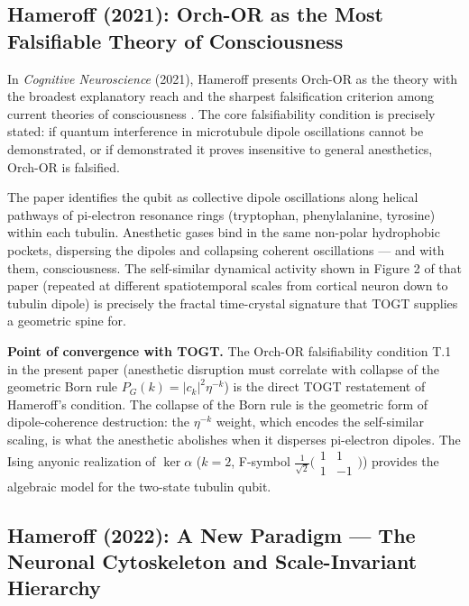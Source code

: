 \documentclass[11pt,a4paper]{article}
\theoremstyle{definition}
\theoremstyle{remark}
\begin{document}
\subsection{Hameroff (2021): Orch-OR as the Most Falsifiable Theory of Consciousness}

In \textit{Cognitive Neuroscience} (2021), Hameroff presents Orch-OR as the theory with the
broadest explanatory reach and the sharpest falsification criterion among current theories of
consciousness \cite{Hameroff2021OrchOR}. The core falsifiability condition is precisely stated:
if quantum interference in microtubule dipole oscillations cannot be demonstrated, or if
demonstrated it proves insensitive to general anesthetics, Orch-OR is falsified.

The paper identifies the qubit as collective dipole oscillations along helical pathways of
pi-electron resonance rings (tryptophan, phenylalanine, tyrosine) within each tubulin.
Anesthetic gases bind in the same non-polar hydrophobic pockets, dispersing the dipoles and
collapsing coherent oscillations --- and with them, consciousness. The self-similar dynamical
activity shown in Figure 2 of that paper (repeated at different spatiotemporal scales from
cortical neuron down to tubulin dipole) is precisely the fractal time-crystal signature that
TOGT supplies a geometric spine for.

\textbf{Point of convergence with TOGT.} The Orch-OR falsifiability condition T.1 in the
present paper (anesthetic disruption must correlate with collapse of the geometric Born rule
$P_G(k)=|c_k|^2\eta^{-k}$) is the direct TOGT restatement of Hameroff's condition. The
collapse of the Born rule is the geometric form of dipole-coherence destruction: the
$\eta^{-k}$ weight, which encodes the self-similar scaling, is what the anesthetic abolishes
when it disperses pi-electron dipoles. The Ising anyonic realization of $\ker\alpha$ ($k=2$,
F-symbol $\tfrac{1}{\sqrt{2}}\bigl(\begin{smallmatrix}1&1\\1&-1\end{smallmatrix}\bigr)$)
provides the algebraic model for the two-state tubulin qubit.

\subsection{Hameroff (2022): A New Paradigm --- The Neuronal Cytoskeleton and Scale-Invariant Hierarchy}
\end{document}

